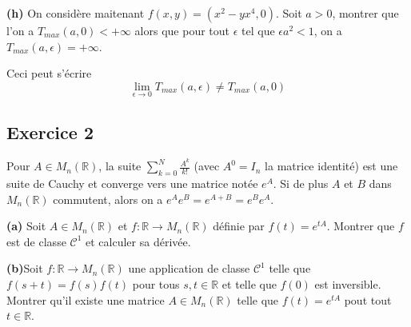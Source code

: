\documentclass[french]{article}
\begin{document}
	\begin{tcolorbox}[colback=gray!5!white,colframe=gray!75!black]
		\textbf{\large{(h)}} On considère maitenant $f(x,y) = (x^2 - yx^4, 0)$. Soit $a>0$, montrer que l'on a $T_{max}(a,0) < +\infty$ alors que pour tout $\epsilon$ tel que $\epsilon a^2 < 1$, on a $T_{max}(a, \epsilon) = +\infty$.
		
		Ceci peut s'écrire
		\[\lim_{\epsilon \to 0} T_{max}(a, \epsilon) \not= T_{max}(a,0)\]
	\end{tcolorbox}

	\subsection*{Exercice 2}
	
	\begin{tcolorbox}[colback=red!5!white,colframe=red!75!black]
		Pour $A \in M_n(\mathbb{R})$, la suite $\sum_{k=0}^{N} \frac{A^k}{k!}$ (avec $A^0 = I_n$ la matrice identité) est une suite de Cauchy et converge vers une matrice notée $e^A$. Si de plus $A$ et $B$ dans $M_n(\mathbb{R})$ commutent, alors on a $e^Ae^B = e^{A+B} = e^Be^A$.
	\end{tcolorbox}

	\begin{tcolorbox}[colback=gray!5!white,colframe=gray!75!black]
		\textbf{\large{(a)}} Soit $A \in M_n(\mathbb{R})$ et $f:\mathbb{R} \to M_n(\mathbb{R})$ définie par $f(t) = e^{tA}$. Montrer que $f$ est de classe $\mathcal{C}^1$ et calculer sa dérivée. 
	\end{tcolorbox}

	\begin{tcolorbox}[colback=gray!5!white,colframe=gray!75!black]
		\textbf{\large{(b)}}Soit $f:\mathbb{R} \to M_n(\mathbb{R})$ une application de classe $\mathcal{C}^1$ telle que $f(s+t) = f(s)f(t)$ pour tous $s,t \in \mathbb{R}$ et telle que $f(0)$ est inversible. Montrer qu'il existe une matrice $A \in M_n(\mathbb{R})$ telle que $f(t) = e^{tA}$ pout tout $t \in \mathbb{R}$.
	\end{tcolorbox}
\end{document}
